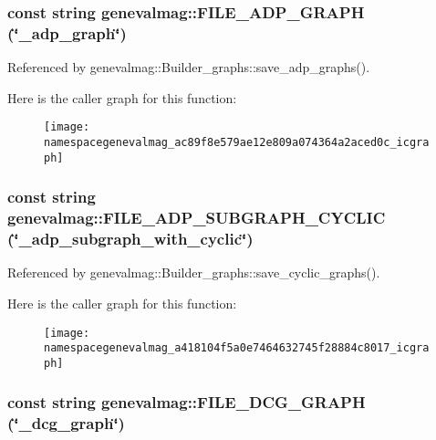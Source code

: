\hypertarget{namespacegenevalmag_ac89f8e579ae12e809a074364a2aced0c}{
\subsubsection[{FILE\_\-ADP\_\-GRAPH}]{\setlength{\rightskip}{0pt plus 5cm}const string genevalmag::FILE\_\-ADP\_\-GRAPH (\char`\"{}\_\-adp\_\-graph\char`\"{})}}
\label{namespacegenevalmag_ac89f8e579ae12e809a074364a2aced0c}


Referenced by genevalmag::Builder\_\-graphs::save\_\-adp\_\-graphs().



Here is the caller graph for this function:\nopagebreak
\begin{figure}[H]
\begin{center}
\leavevmode
\texttt{[image: namespacegenevalmag\_ac89f8e579ae12e809a074364a2aced0c\_icgraph]}
\end{center}
\end{figure}


\hypertarget{namespacegenevalmag_a418104f5a0e7464632745f28884c8017}{
\subsubsection[{FILE\_\-ADP\_\-SUBGRAPH\_\-CYCLIC}]{\setlength{\rightskip}{0pt plus 5cm}const string genevalmag::FILE\_\-ADP\_\-SUBGRAPH\_\-CYCLIC (\char`\"{}\_\-adp\_\-subgraph\_\-with\_\-cyclic\char`\"{})}}
\label{namespacegenevalmag_a418104f5a0e7464632745f28884c8017}


Referenced by genevalmag::Builder\_\-graphs::save\_\-cyclic\_\-graphs().



Here is the caller graph for this function:\nopagebreak
\begin{figure}[H]
\begin{center}
\leavevmode
\texttt{[image: namespacegenevalmag\_a418104f5a0e7464632745f28884c8017\_icgraph]}
\end{center}
\end{figure}


\hypertarget{namespacegenevalmag_a009f31ef1d07f4ca8786f9e2cc813279}{
\subsubsection[{FILE\_\-DCG\_\-GRAPH}]{\setlength{\rightskip}{0pt plus 5cm}const string genevalmag::FILE\_\-DCG\_\-GRAPH (\char`\"{}\_\-dcg\_\-graph\char`\"{})}}
\label{namespacegenevalmag_a009f31ef1d07f4ca8786f9e2cc813279}


